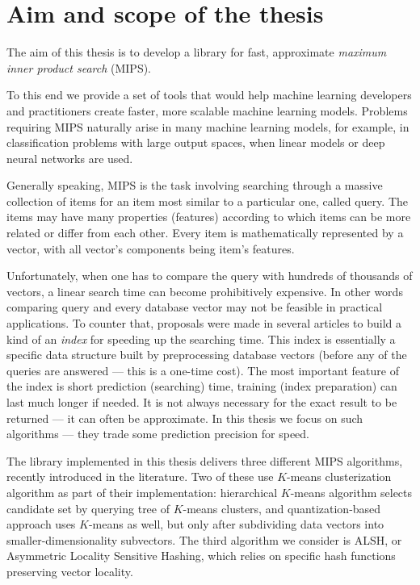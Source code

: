\section{Aim and scope of the thesis}

The aim of this thesis is to develop a library for fast,
approximate \textit{maximum inner product search} (MIPS).

To this end we provide a set of tools that would help machine
learning developers and practitioners create faster, more scalable machine learning models.
Problems requiring MIPS naturally arise in many machine learning models, for example, in
classification problems with large output spaces, when linear models or deep neural networks are used.

Generally speaking, MIPS is the task involving searching through a massive collection of items for
an item most similar to a particular one, called query. The items may have many properties (features)
according to which items can be more related or differ from each other.
Every item is mathematically represented by a vector, with all vector's components being item's features.

Unfortunately, when one has to compare the query with hundreds of thousands of vectors,
a linear search time can become prohibitively expensive.
In other words comparing query and every database vector may not be feasible in practical applications.
To counter that, proposals were made in several articles to build a kind of an \textit{index} for speeding
up the searching time.
This index is essentially a specific data structure built by preprocessing database vectors (before
any of the queries are answered --- this is a one-time cost).
The most important feature of the index is short prediction (searching) time, training (index preparation)
can last much longer if needed.
It is not always necessary for the exact result to be returned --- it can often be approximate.
In this thesis we focus on such algorithms --- they trade some prediction precision for speed.

The library implemented in this thesis delivers three different MIPS algorithms,
recently introduced in the literature.
Two of these use $K$-means clusterization algorithm as part of their implementation: hierarchical $K$-means algorithm
selects candidate set by querying tree of $K$-means clusters, and quantization-based approach uses $K$-means as well, 
but only after subdividing data vectors into smaller-dimensionality subvectors. The third algorithm we consider
is ALSH, or Asymmetric Locality Sensitive Hashing, which relies on specific hash functions preserving
vector locality.

